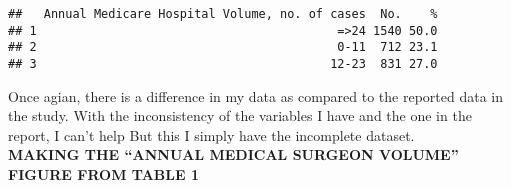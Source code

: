 \documentclass[
]{article}
\newenvironment{Shaded}{\begin{snugshade}}{\end{snugshade}}
\newcommand{\ControlFlowTok}[1]{\textcolor[rgb]{0.13,0.29,0.53}{\textbf{#1}}}
\newcommand{\DecValTok}[1]{\textcolor[rgb]{0.00,0.00,0.81}{#1}}
\newcommand{\FunctionTok}[1]{\textcolor[rgb]{0.00,0.00,0.00}{#1}}
\newcommand{\NormalTok}[1]{#1}
\newcommand{\OtherTok}[1]{\textcolor[rgb]{0.56,0.35,0.01}{#1}}
\newcommand{\SpecialCharTok}[1]{\textcolor[rgb]{0.00,0.00,0.00}{#1}}
\newcommand{\StringTok}[1]{\textcolor[rgb]{0.31,0.60,0.02}{#1}}
\begin{document}
\begin{verbatim}
##   Annual Medicare Hospital Volume, no. of cases  No.    %
## 1                                          =>24 1540 50.0
## 2                                          0-11  712 23.1
## 3                                         12-23  831 27.0
\end{verbatim}

Once agian, there is a difference in my data as compared to the reported
data in the study. With the inconsistency of the variables I have and
the one in the report, I can't help But this I simply have the
incomplete dataset.\\
\textbf{MAKING THE ``ANNUAL MEDICAL SURGEON VOLUME'' FIGURE FROM TABLE
1}

\begin{Shaded}
\end{Shaded}
\end{document}
